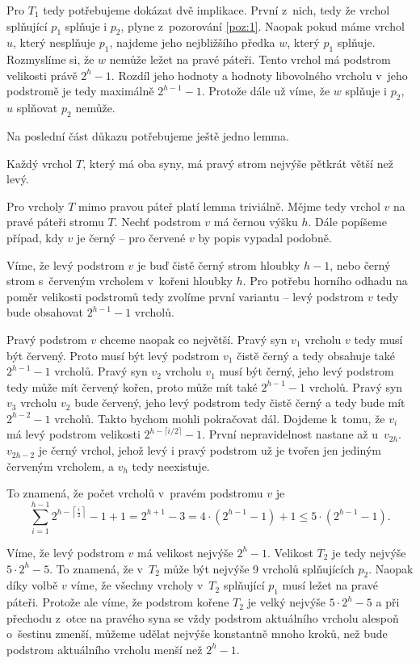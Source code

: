 \begin{dukaz}
Pro $T_1$ tedy potřebujeme dokázat dvě implikace. První z~nich, tedy že vrchol
splňující $p_1$ splňuje i $p_2$, plyne z~pozorování \ref{poz:1}. Naopak pokud
máme vrchol $u$, který nesplňuje $p_1$, najdeme jeho nejbližšího předka $w$,
který $p_1$ splňuje. Rozmyslíme si, že $w$ nemůže ležet na pravé páteři. Tento vrchol má podstrom velikosti právě $2^{h}-1$. Rozdíl
jeho hodnoty a hodnoty libovolného vrcholu v~jeho podstromě je tedy maximálně
$2^{h-1}-1$. Protože dále už víme, že $w$ splňuje i $p_2$, $u$ splňovat $p_2$
nemůže.

Na poslední část důkazu potřebujeme ještě jedno lemma.

\begin{lemma}
Každý vrchol $T$, který má oba syny, má pravý strom nejvýše pětkrát větší než levý.
\end{lemma}
\begin{dukaz}
Pro vrcholy $T$ mimo pravou páteř platí lemma triviálně. Mějme tedy vrchol $v$ na pravé páteři stromu $T$. Nechť podstrom $v$ má černou výšku $h$. Dále popíšeme případ, kdy $v$ je černý -- pro červené $v$ by popis vypadal podobně. 

Víme, že levý podstrom $v$ je buď čistě černý strom hloubky $h-1$, nebo černý strom s~červeným vrcholem v~kořeni hloubky $h$. Pro potřebu horního odhadu na poměr velikosti podstromů tedy zvolíme první variantu -- levý podstrom $v$ tedy bude obsahovat $2^{h-1} -1$ vrcholů. 

Pravý podstrom $v$ chceme naopak co největší. Pravý syn $v_1$ vrcholu $v$ tedy musí být červený. Proto musí být levý podstrom $v_1$ čistě černý a tedy obsahuje také $2^{h-1} -1$ vrcholů. Pravý syn $v_2$ vrcholu $v_1$ musí být černý, jeho levý podstrom tedy může mít červený kořen, proto může mít také $2^{h-1} -1$ vrcholů. Pravý syn $v_3$ vrcholu $v_2$ bude červený, jeho levý podstrom tedy čistě černý a tedy bude mít $2^{h-2}-1$ vrcholů. Takto bychom mohli pokračovat dál. Dojdeme k~tomu, že $v_i$ má levý podstrom velikosti $2^{h-\lceil i/2\rceil} -1$. První nepravidelnost nastane až u~$v_{2h}$. $v_{2h-2}$ je černý vrchol, jehož levý i pravý podstrom už je tvořen jen jediným červeným vrcholem, a $v_h$ tedy neexistuje.

To znamená, že počet vrcholů v~pravém podstromu $v$ je $$\sum_{i=1}^{h-1}2^{h-\left\lceil \frac i2\right\rceil} -1 +1 = 2^{h+1}-3 = 4\cdot (2^{h-1}-1) +1 \leq 5\cdot(2^{h-1}-1).$$
\end{dukaz}

Víme, že levý podstrom $v$ má velikost nejvýše $2^h-1$. Velikost $T_2$ je tedy nejvýše $5\cdot 2^h - 5$. To znamená, že v~$T_2$ může být nejvýše 9 vrcholů splňujících $p_2$. Naopak díky volbě $v$ víme, že všechny vrcholy v~$T_2$ splňující $p_1$ musí ležet na pravé páteři. Protože ale víme, že podstrom kořene $T_2$ je velký nejvýše $5\cdot 2^h-5$ a při přechodu z~otce na pravého syna se vždy podstrom aktuálního vrcholu alespoň o~šestinu zmenší, můžeme udělat nejvýše konstantně mnoho kroků, než bude podstrom aktuálního vrcholu menší než $2^h-1$. 
\end{dukaz}

